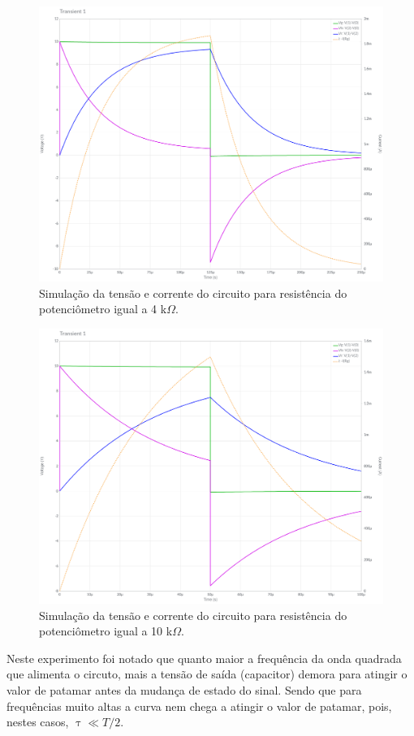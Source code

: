 \documentclass[11pt]{article}
\begin{document}
\begin{figure}[h!]
  \centering
  \includegraphics[width=.9\textwidth]{fig/2-f-4k}
  \caption{Simulação da tensão e corrente do circuito para resistência do potenciômetro igual a 4 k$\Omega$.}
  \label{}
\end{figure}

\begin{figure}[h!]
  \centering
  \includegraphics[width=.9\textwidth]{fig/2-f-10k}
  \caption{Simulação da tensão e corrente do circuito para resistência do potenciômetro igual a 10 k$\Omega$.}
  \label{}
\end{figure}

Neste experimento foi notado que quanto maior a frequência da onda quadrada que alimenta o circuto, mais a tensão de saída (capacitor) demora para atingir o valor de patamar antes da mudança de estado do sinal. Sendo que para frequências muito altas a curva nem chega a atingir o valor de patamar, pois, nestes casos, $\uptau \ll T/2$.
\end{document}
